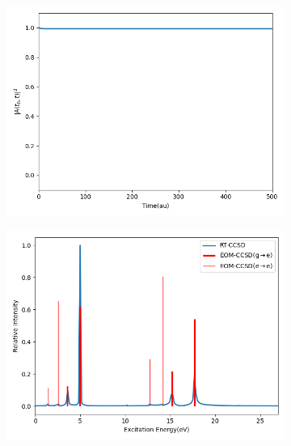 \begin{figure}
     \centering
     \begin{subfigure}{0.47\textwidth}
         \centering
         \includegraphics[width=\textwidth]{ch4/Figs/12-1.png}
     \end{subfigure}
     \hfill
     \begin{subfigure}{0.47\textwidth}
         \centering
         \includegraphics[width=\textwidth]{ch4/Figs/12-2.png}
      \end{subfigure}
       \vfill
     \begin{subfigure}{0.47\textwidth}
         \centering

\end{subfigure}
\end{figure}
